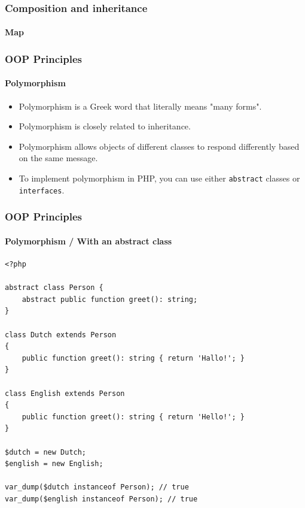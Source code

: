 \begin{frame}[fragile,c]
    \frametitle{Composition and inheritance}
    \framesubtitle{Map}

\end{frame}

\begin{frame}
    \frametitle{OOP Principles}
    \framesubtitle{Polymorphism}

    \begin{itemize}[<+->]
        \item Polymorphism is a Greek word that literally means "many forms".
        \item Polymorphism is closely related to inheritance.
        \item Polymorphism allows objects of different classes to respond differently based on the same message.
        \item To implement polymorphism in PHP, you can use either \texttt{abstract} classes or \texttt{interfaces}.
    \end{itemize}
\end{frame}

\begin{frame}[fragile,c]
    \frametitle{OOP Principles}
    \framesubtitle{Polymorphism / With an abstract class}

    \begin{lstlisting}
<?php

abstract class Person {
    abstract public function greet(): string;
}

class Dutch extends Person
{
    public function greet(): string { return 'Hallo!'; }
}

class English extends Person
{
    public function greet(): string { return 'Hello!'; }
}

$dutch = new Dutch;
$english = new English;

var_dump($dutch instanceof Person); // true
var_dump($english instanceof Person); // true
    \end{lstlisting}
\end{frame}

